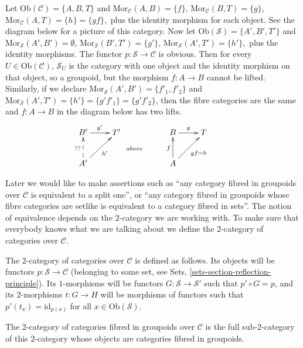 \begin{example}
Let $ \text{Ob}(\mathcal{C}) = \{A,B,T\}$ and 
$\text{Mor}_\mathcal{C}(A,B) = \{f\}$, $\text{Mor}_\mathcal{C}(B,T) = \{g\}$,
$\text{Mor}_\mathcal{C}(A,T) = \{h\} = \{gf\},$ plus the identity morphism for 
each object. See the diagram below for a picture of this category. Now let 
$\text{Ob}(\mathcal{S}) = \{A',B',T'\}$ and 
$\text{Mor}_\mathcal{S}(A',B') = \emptyset$,  
$\text{Mor}_\mathcal{S}(B',T') = \{g'\}$,  
$\text{Mor}_\mathcal{S}(A',T') = \{h'\},$ plus the identity morphisms. The 
functor $p : \mathcal{S} \to \mathcal{C}$ is obvious. Then for every 
$U \in \text{Ob}(\mathcal{C})$, $\mathcal{S}_U$ is the category with one 
object and the identity morphism on that object, so a groupoid, but the 
morphism $f: A \to B$ cannot be lifted. Similarly, if we declare 
$\text{Mor}_\mathcal{S}(A',B') = \{f'_1, f'_2\}$ and 
$ \text{Mor}_\mathcal{S}(A',T') = \{h'\} = \{g'f'_1 \} = \{g'f'_2\}$, then 
the fibre categories are the same and $f: A \to B$ in the diagram below has 
two lifts. 
$$
\xymatrix{
B' \ar[r]^{g'} & T' &  & B \ar[r]^g & T & \\
A' \ar@{-->}[u]^{??} \ar[ru]_{h'} & & \ar@{}[u]^{above} &
A \ar[u]^f \ar[ru]_{gf = h} & \\
}
$$ 
\end{example}

\noindent
Later we would like to make assertions such as ``any category fibred in
groupoids over $\mathcal{C}$ is equivalent to a split one'', or
``any category fibred in groupoids whose fibre categories are setlike
is equivalent to a category fibred in sets''. The notion of equivalence
depends on the $2$-category we are working with. To make sure
that everybody knows what we are talking about we define the
$2$-category of categories over $\mathcal{C}$.

\begin{definition}
\label{definition-categories-over-C}
The $2$-category of categories over $\mathcal{C}$ is defined
as follows. Its objects will be functors 
$p : \mathcal{S} \to \mathcal{C}$ (belonging to
some set, see Sets, \autoref{sets-section-reflection-principle}). Its 
$1$-morphisms will be functors $G : \mathcal{S} \to \mathcal{S}'$
such that $p' \circ G = p$, and its $2$-morphisms $t : G \to H$
will be morphisms of functors such that $p'(t_x) = \text{id}_{p(x)}$
for all $x \in \text{Ob}(\mathcal{S})$.
\end{definition}

\noindent
The $2$-category of categories fibred in groupoids over $\mathcal{C}$
is the full sub-$2$-category of this $2$-category whose objects
are categories fibred in groupoids.

